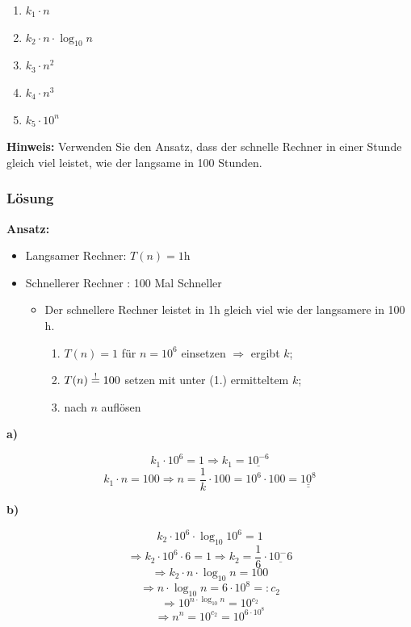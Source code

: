 \begin{enumerate}
  \item $k_1 \cdot n$
  \item $k_2 \cdot n \cdot \log_{10} n$
  \item $k_3 \cdot n^2$
  \item $k_4 \cdot n^3$
  \item $k_5 \cdot 10^n$
\end{enumerate}

\textbf{Hinweis:}
Verwenden Sie den Ansatz, dass der schnelle Rechner in einer Stunde gleich viel leistet, wie der
langsame in 100 Stunden.

\subsubsection{Lösung}


\textbf{Ansatz:}

\begin{itemize}
  \item Langsamer Rechner: $T(n) = 1 \text{h}$
  \item Schnellerer Rechner : 100 Mal Schneller
  \begin{itemize}
    \item Der schnellere Rechner leistet in 1h gleich viel wie der langsamere in 100 h.
    \begin{enumerate}
      \item $T(n) = 1$ für $n= 10^6$ einsetzen $\Rightarrow$ ergibt $k$;
      \item $T(n)\mathrel{\stackon[1pt]{$=$}{$\scriptstyle!$}} 100 $ setzen mit unter (1.) ermitteltem $k$;
      \item nach $n$ auflösen
        \end{enumerate}
  \end{itemize}
\end{itemize}

\noindent
\textbf{a)}

\medskip

$$ k_1 \cdot 10^6 = 1 \Longrightarrow k_1 = \underline{10^{-6}}$$
$$ k_1 \cdot n = 100 \Longrightarrow n = \frac{1}{k} \cdot 100 = 10^6 \cdot 100 = \underline{\underline{10^8}}$$

\medskip

\noindent
\textbf{b)}
\medskip

$$ k_2 \cdot 10^6\cdot \log_{10} 10^6 = 1$$
$$\Rightarrow k_2 \cdot 10^6 \cdot 6 = 1 \Rightarrow k_2 = \frac{1}{6} \cdot \underline{10^-6}$$
$$ \Rightarrow k_2 \cdot n \cdot \log_{10} n = 100$$
$$ \Rightarrow n \cdot \log_{10} n = 6 \cdot 10^8 =: c_2 $$
$$\Rightarrow 10^{n \cdot \log_{10} n} = 10^{c_2}$$
$$\Rightarrow n^n = 10^{c_2} = 10^{6\cdot10^8}$$
\medskip

